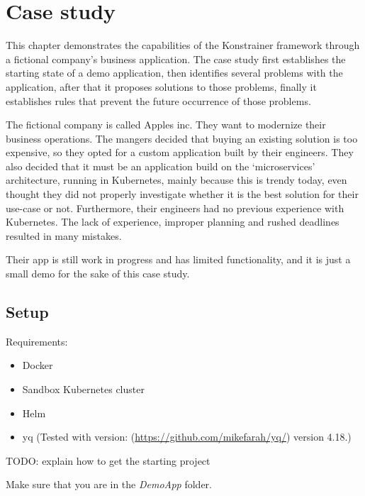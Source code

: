 \chapter{Case study}

This chapter demonstrates the capabilities of the Konstrainer framework through a fictional company's business application. The case study first establishes the starting state of a demo application, then identifies several problems with the application, after that it proposes solutions to those problems, finally it establishes rules that prevent the future occurrence of those problems.

The fictional company is called Apples inc. They want to modernize their business operations. The mangers decided that buying an existing solution is too expensive, so they opted for a custom application built by their engineers. They also decided that it must be an application build on the `microservices' architecture, running in Kubernetes, mainly because this is trendy today, even thought they did not properly investigate whether it is the best solution for their use-case or not. Furthermore, their engineers had no previous experience with Kubernetes. The lack of experience, improper planning and rushed deadlines resulted in many mistakes.

Their app is still work in progress and has limited functionality, and it is just a small demo for the sake of this case study.

\section{Setup}

Requirements:

\begin{itemize}
    \item Docker
    \item Sandbox Kubernetes cluster
    \item Helm
    \item yq (Tested with version: (\url{https://github.com/mikefarah/yq/}) version 4.18.)
\end{itemize}

TODO: explain how to get the starting project


Make sure that you are in the \emph{DemoApp} folder.

